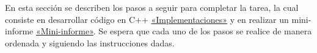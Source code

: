 
En esta sección se describen los pasos a seguir para completar la tarea, la cual consiste en desarrollar código en C++ \hyperref[subsec:implementaciones]{«Implementaciones»} y en realizar un mini-informe \hyperref[subsec:mini-informe]{«Mini-informe»}. Se espera que cada uno de los pasos se realice de manera ordenada y siguiendo las instrucciones dadas.
